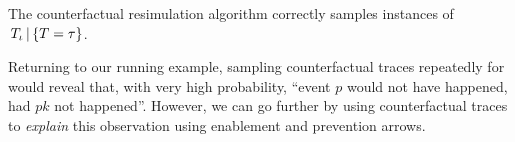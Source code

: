 \begin{theorem}%
  The counterfactual resimulation algorithm correctly samples
  instances of $\,{T_\iota\,|\,\{T=\tau\}}{}$.
\end{theorem}


 


Returning to our running example, sampling counterfactual traces
repeatedly for \RefTrace{} would reveal that, with very high
probability, ``event $p$ would not have happened, had $pk$ not
happened''. However, we can go further by using counterfactual traces
to \textit{explain} this observation using enablement and prevention
arrows.
